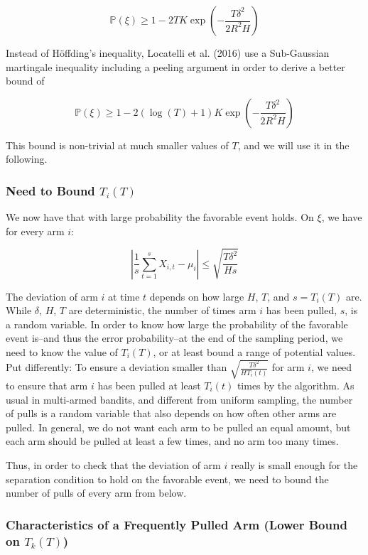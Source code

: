 \documentclass[11pt,]{article}
\begin{document}
\[
\mathbb{P}(\xi) \geq 1 - 2TK \exp(-\frac{T\delta^2}{2R^2H})
\]

Instead of Höffding's inequality, Locatelli et al. (2016) use a
Sub-Gaussian martingale inequality including a peeling argument in order
to derive a better bound of

\[
\mathbb{P}(\xi) \geq 1 - 2(\log(T) +1)K \exp(-\frac{T\delta^2}{2R^2H})
\]

This bound is non-trivial at much smaller values of \(T\), and we will
use it in the following.

\subsubsection{\texorpdfstring{Need to Bound
\(T_i(T)\)}{Need to Bound T\_i(T)}}\label{need-to-bound-t_it}

We now have that with large probability the favorable event holds. On
\(\xi\), we have for every arm \(i\):

\[
|\frac{1}{s} \sum_{t=1}^{s}X_{i,t} - \mu_i| \leq \sqrt{\frac{T \delta^2}{H s}}
\]

The deviation of arm \(i\) at time \(t\) depends on how large \(H\),
\(T\), and \(s = T_i(T)\) are. While \(\delta\), \(H\), \(T\) are
deterministic, the number of times arm \(i\) has been pulled, \(s\), is
a random variable. In order to know how large the probability of the
favorable event is--and thus the error probability--at the end of the
sampling period, we need to know the value of \(T_i(T)\), or at least
bound a range of potential values. Put differently: To ensure a
deviation smaller than \(\sqrt{\frac{T\delta^2}{HT_i(t)}}\) for arm
\(i\), we need to ensure that arm \(i\) has been pulled at least
\(T_i(t)\) times by the algorithm. As usual in multi-armed bandits, and
different from uniform sampling, the number of pulls is a random
variable that also depends on how often other arms are pulled. In
general, we do not want each arm to be pulled an equal amount, but each
arm should be pulled at least a few times, and no arm too many times.

Thus, in order to check that the deviation of arm \(i\) really is small
enough for the separation condition to hold on the favorable event, we
need to bound the number of pulls of every arm from below.

\subsubsection{\texorpdfstring{Characteristics of a Frequently Pulled
Arm (Lower Bound on
\(T_k(T)\))}{Characteristics of a Frequently Pulled Arm (Lower Bound on T\_k(T))}}\label{characteristics-of-a-frequently-pulled-arm-lower-bound-on-t_kt}
\end{document}
